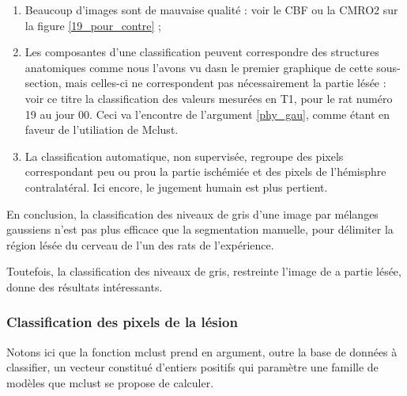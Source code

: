 \begin{enumerate}[label=\textbf{(Contre\arabic*)}]
\item Beaucoup d'images sont de mauvaise qualit\'e : voir le CBF ou la CMRO2 sur la figure \ref{19_pour_contre} ;
%
\item Les composantes d'une classification peuvent correspondre  des structures anatomiques comme nous l'avons vu dasn le premier graphique de cette sous-section, %
mais celles-ci ne correspondent pas n\'ecessairement  la partie l\'es\'ee : %
voir  ce titre la classification des valeurs mesur\'ees en T1, pour le rat num\'ero 19 au jour 00. %
Ceci va  l'encontre de l'argument \ref{phy_gau}, comme \'etant en faveur de l'utiliation de Mclust.
%
\item La classification automatique, non supervis\'ee, regroupe des pixels correspondant peu ou prou  la partie isch\'emi\'ee et des pixels de l'h\'emisphre contralat\'eral. %
Ici encore, le jugement humain est plus pertient.
\end{enumerate}

\ligneinter
En conclusion, la classification des niveaux de gris d'une image par m\'elanges gaussiens n'est pas plus efficace que la segmentation manuelle, %
pour d\'elimiter la r\'egion l\'es\'ee du cerveau de l'un des rats de l'exp\'erience.

\par
Toutefois, la classification des niveaux de gris, restreinte  l'image de a partie l\'es\'ee, donne des r\'esultats int\'eressants.

\FloatBarrier
\subsubsection{Classification des pixels de la l\'esion}

Notons ici que la fonction mclust prend en argument, outre la base de données à classifier,
un vecteur constitué d'entiers positifs qui paramètre une famille de modèles que mclust se propose de calculer.

